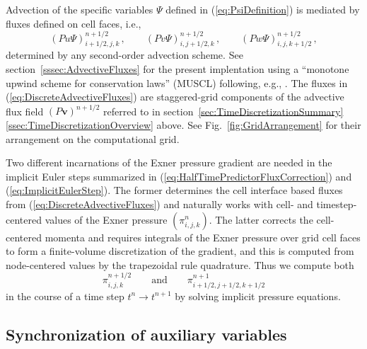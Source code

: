 \documentclass{ametsoc}
\theoremstyle{definition}
\newcommand{\eq}[1]{(\ref{#1})}
\newcommand{\vect}[1]{{\mathbf{#1}}}
\newcommand{\vv}{\vect{v}}
\newcommand{\half}{1/2}
\begin{document}
Advection of the specific variables $\Psi$ defined in \eq{eq:PsiDefinition} is mediated by fluxes defined 
on cell faces, i.e.,
%
\begin{equation}\label{eq:DiscreteAdvectiveFluxes}
(Pu \Psi)^{n+\half}_{i+\half,j,k}\,,
\qquad
(Pv \Psi)^{n+\half}_{i,j+\half,k}\,, 
\qquad
(Pw \Psi)^{n+\half}_{i,j,k+\half}\,,
\end{equation}
%
determined by any second-order advection scheme. See 
section~\ref{sssec:AdvectiveFluxes} for the present implentation using
a ``monotone upwind scheme for conservation laws'' (MUSCL) 
following, e.g., \citet{vanLeer2006}. 
The fluxes in \eq{eq:DiscreteAdvectiveFluxes} are staggered-grid 
components of the advective flux field $(P\vv)^{n+\half}$ referred
to in section~\ref{sec:TimeDiscretizationSummary}\ref{ssec:TimeDiscretizationOverview} above. See
Fig.~\ref{fig:GridArrangement} for their arrangement on the computational 
grid.

Two different incarnations of the Exner pressure gradient are needed in 
the implicit Euler steps summarized in \eq{eq:HalfTimePredictorFluxCorrection} 
and \eq{eq:ImplicitEulerStep}. The former determines the cell interface
based fluxes from \eq{eq:DiscreteAdvectiveFluxes} and naturally works with 
cell- and timestep-centered values of the Exner pressure $\left(\pi_{i,j,k}^n\right)$. 
The latter corrects the cell-centered momenta and requires integrals of the Exner 
pressure over grid cell faces to form a finite-volume discretization of 
the gradient, and this is computed from node-centered values by the 
trapezoidal rule quadrature. Thus we compute both
%
\begin{equation}\label{eq:ExnerPressures}
\pi_{i,j,k}^{n+\half} 
\qquad\text{and}\qquad
\pi_{i+\half,j+\half,k+\half}^{n+1} 
\end{equation}
%
in the course of a time step $t^{n} \to t^{n+1}$ by solving implicit 
pressure equations. 


\subsection{Synchronization of auxiliary variables}
\label{ssec:Synchronization}
\end{document}
